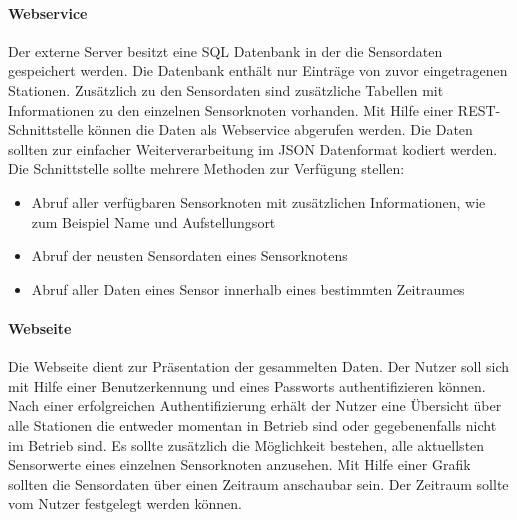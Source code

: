 \paragraph{Webservice}
Der externe Server besitzt eine SQL Datenbank in der die Sensordaten gespeichert werden. Die Datenbank enthält nur Einträge von zuvor eingetragenen Stationen. Zusätzlich zu den Sensordaten sind zusätzliche Tabellen mit Informationen zu den einzelnen Sensorknoten vorhanden. Mit Hilfe einer REST-Schnittstelle können die Daten als Webservice abgerufen werden. Die Daten sollten zur einfacher Weiterverarbeitung im JSON Datenformat kodiert werden. Die Schnittstelle sollte mehrere Methoden zur Verfügung stellen:
\begin{itemize}
	\item Abruf aller verfügbaren Sensorknoten mit zusätzlichen Informationen, wie zum Beispiel Name und Aufstellungsort
	\item Abruf der neusten Sensordaten eines Sensorknotens
	\item Abruf aller Daten eines Sensor innerhalb eines bestimmten Zeitraumes
\end{itemize}
\paragraph{Webseite} Die Webseite dient zur Präsentation der gesammelten Daten. Der Nutzer soll sich mit Hilfe einer Benutzerkennung und eines Passworts authentifizieren können. Nach einer erfolgreichen Authentifizierung erhält der Nutzer eine Übersicht über alle Stationen die entweder momentan in Betrieb sind oder gegebenenfalls nicht im Betrieb sind. Es sollte zusätzlich die Möglichkeit bestehen, alle aktuellsten Sensorwerte eines einzelnen Sensorknoten anzusehen. Mit Hilfe einer Grafik sollten die Sensordaten über einen Zeitraum anschaubar sein. Der Zeitraum sollte vom Nutzer festgelegt werden können.
